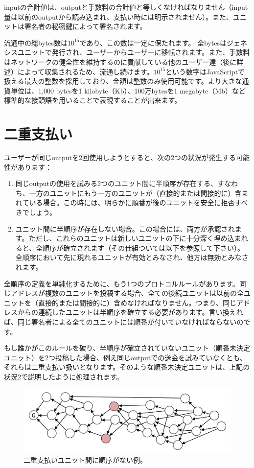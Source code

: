 \documentclass[a4paper, dvipdfmx]{jsarticle}
\begin{document}
\noindent inputの合計値は、outputと手数料の合計値と等しくなければなりません（input量は以前のoutputから読み込まれ、支払い時には明示されません）。また、ユニットは署名者の秘密鍵によって署名されます。

流通中の総bytes数は$10^{15}$であり、この数は一定に保たれます。 全bytesはジェネシスユニットで発行され、ユーザーからユーザーに移転されます。また、手数料はネットワークの健全性を維持するのに貢献している他のユーザー達（後に詳述）によって収集されるため、流通し続けます。$10^{15}$という数字はJavaScriptで扱える最大の整数を採用しており、金額は整数のみ使用可能です。より大きな通貨単位は、1,000 bytesを1 kilobyte（Kb）、100万bytesを1 megabyte（Mb）など標準的な接頭語を用いることで表現することが出来ます。

\section{二重支払い}
ユーザーが同じoutputを2回使用しようとすると、次の2つの状況が発生する可能性があります：

\begin{enumerate}
    \item 同じoutputの使用を試みる2つのユニット間に半順序が存在する、すなわち、一方のユニットにもう一方のユニットが（直接的または間接的に）含まれている場合。この時には、明らかに順番が後のユニットを安全に拒否すべきでしょう。
    \item ユニット間に半順序が存在しない場合。この場合には、両方が承認されます。ただし、これらのユニットは新しいユニットの下に十分深く埋め込まれると、全順序が確立されます（その仕組ついては以下を参照して下さい）。全順序において先に現れるユニットが有効とみなされ、他方は無効とみなされます。
\end{enumerate}

全順序の定義を単純化するために、もう1つのプロトコルルールがあります。同じアドレスが複数のユニットを投稿する場合、全ての後続ユニットは以前の全ユニットを（直接的または間接的に）含めなければなりません。つまり、同じアドレスからの連続したユニットは半順序を確立する必要があります。言い換えれば、同じ署名者による全てのユニットには順番が付いていなければならないのです。

もし誰かがこのルールを破り、半順序が確立されていないユニット（順番未決定ユニット）を2つ投稿した場合、例え同じoutputでの送金を試みていなくとも、それらは二重支払い扱いとなります。そのような順番未決定ユニットは、上記の状況2で説明したように処理されます。

\begin{figure}[htbp]
  \includegraphics[width=\linewidth]{fig2.png}
  \caption{二重支払いユニット間に順序がない例。}
\end{figure}
\end{document}
